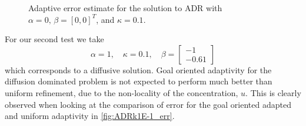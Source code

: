 \begin{test}[Pure Diffusion, i.e. Heat Equation, $\kappa = 0.1$]
    \begin{figure}[h]
        \centering
        \caption{Adaptive error estimate for the solution to ADR with
             $\alpha = 0,\, \beta = [0, 0]^T$, and $\kappa=0.1$.}
        \label{fig:Heatk1E-1_err}
    \end{figure}

\end{test}

\begin{test}[Diffusion Dominated ADR, $\kappa = 0.1$] \label{tst:ADRk1E-1}
    For our second test we take
    \begin{equation*}
        \alpha = 1, \quad
        \kappa = 0.1, \quad
        \beta = \begin{bmatrix} -1 \\ -0.61 \end{bmatrix}
    \end{equation*}
    which corresponds to a diffusive solution. Goal oriented adaptivity for
    the diffusion dominated problem is not expected to perform much better than
    uniform refinement, due to the non-locality of the concentration, $u$. This is
    clearly observed when looking at the comparison of error for the goal
    oriented adapted and uniform adaptivity in \autoref{fig:ADRk1E-1_err}.
    \begin{figure}[h]
        \centering
        \begin{minipage}[t]{0.49\textwidth}
            \centering
\end{minipage}
\end{figure}
\end{test}
